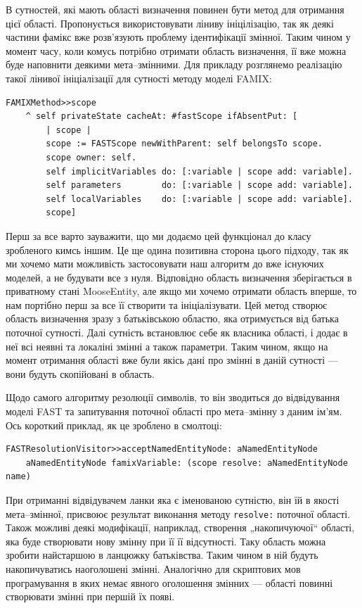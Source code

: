 \documentclass[12pt,a4paper]{article}
\begin{document}
В сутностей, які мають області визначення повинен бути метод для отримання цієї області. Пропонується використовувати ліниву ініцілізацію, так як деякі частини фамікс вже розв'язують проблему ідентифікації змінної. Таким чином у момент часу, коли комусь потрібно отримати область визначення, її вже можна буде наповнити деякими мета--змінними. Для прикладу розглянемо реалізацію такої лінивої ініціалізації для сутності методу моделі FAMIX:
\begin{lstlisting}[language=Smalltalk]
FAMIXMethod>>scope
	^ self privateState cacheAt: #fastScope ifAbsentPut: [
		| scope |
		scope := FASTScope newWithParent: self belongsTo scope.
		scope owner: self.
		self implicitVariables do: [:variable | scope add: variable].
		self parameters        do: [:variable | scope add: variable].
		self localVariables    do: [:variable | scope add: variable].
		scope]
\end{lstlisting}

Перш за все варто зауважити, що ми додаємо цей функціонал до класу зробленого кимсь іншим. Це ще одина позитивна сторона цього підходу, так як ми хочемо мати можливість застосовувати наш алгоритм до вже існуючих моделей, а не будувати все з нуля. Відповідно область визначення зберігається в приватному стані MooseEntity, але якщо ми хочемо отримати область вперше, то нам портібно перш за все її створити та ініціалізувати. Цей метод створює область визначення зразу з батьківською областю, яка отримується від батька поточної сутності. Далі сутність встановлює себе як власника області, і додає в неї всі неявні та локаліні змінні а також параметри. Таким чином, якщо на момент отримання області вже були якісь дані про змінні в даній сутності --- вони будуть скопійовані в область.

Щодо самого алгоритму резолюції символів, то він зводиться до відвідування моделі FAST та запитування поточної області про мета--змінну з даним ім'ям. Ось короткий приклад, як це зроблено в смолтоці:
\begin{lstlisting}[language=Smalltalk]
FASTResolutionVisitor>>acceptNamedEntityNode: aNamedEntityNode
	aNamedEntityNode famixVariable: (scope resolve: aNamedEntityNode name)
\end{lstlisting}

При отриманні відвідувачем ланки яка є іменованою сутністю, він їй в якості мета--змінної, присвоює результат виконання методу \lstinline$resolve:$ поточної області. Також можливі деякі модифікації, наприклад, створення „накопичуючої“ області, яка буде створювати нову змінну при її її відсутності. Таку область можна зробити найстаршою в ланцюжку батьківства. Таким чином в ній будуть накопичуватись наоголошені змінні. Аналогічно для скриптових мов програмування в яких немає явного оголошення змінних --- області повинні створювати змінні при першій їх появі.
\clearpage
\end{document}
